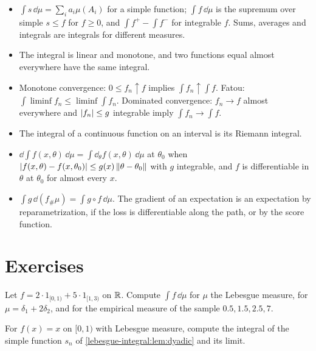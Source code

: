 \begin{notechapter}
\begin{chaptersummary}
\begin{itemize}[nosep]
  \item $\int s\,\dd\mu = \sum_ia_i\mu(A_i)$ for a simple function;
        $\int f\,\dd\mu$ is the supremum over simple $s\leq f$ for
        $f\geq0$, and $\int f^+ - \int f^-$ for integrable $f$. Sums,
        averages and integrals are integrals for different measures.
  \item The integral is linear and monotone, and two functions equal
        almost everywhere have the same integral.
  \item Monotone convergence: $0\leq f_n\uparrow f$ implies
        $\int f_n\uparrow\int f$. Fatou:
        $\int\liminf f_n\leq\liminf\int f_n$. Dominated convergence:
        $f_n\to f$ almost everywhere and $\left|f_n\right|\leq g$ integrable
        imply $\int f_n\to\int f$.
  \item The integral of a continuous function on an interval is its
        Riemann integral.
  \item $\dd\int f(x, \theta)\,\dd\mu = \int\dd_\theta f(x, \theta)\,\dd\mu$
        at $\theta_0$ when
        $\left|f(x, \theta) - f(x, \theta_0)\right|\leq g(x)\left\|\theta - \theta_0\right\|$
        with $g$ integrable, and $f$ is differentiable in $\theta$ at
        $\theta_0$ for almost every $x$.
  \item $\int g\,\dd(f_\#\mu) = \int g\circ f\,\dd\mu$. The gradient
        of an expectation is an expectation by reparametrization, if the
        loss is differentiable along the path, or by the score function.
\end{itemize}
\end{chaptersummary}

\section*{Exercises}

\begin{exercise}\label{lebesgue-integral:exr:1}
Let $f = 2\cdot1_{[0, 1)} + 5\cdot1_{[1, 3)}$ on $\mathbb{R}$. Compute
$\int f\,\dd\mu$ for $\mu$ the Lebesgue measure, for
$\mu = \delta_1 + 2\delta_2$, and for the empirical measure of the
sample $0.5, 1.5, 2.5, 7$.
\end{exercise}

\begin{exercise}\label{lebesgue-integral:exr:2}
For $f(x) = x$ on $[0, 1)$ with Lebesgue measure, compute the integral
of the simple function $s_n$ of \cref{lebesgue-integral:lem:dyadic} and
its limit.
\end{exercise}


\end{notechapter}
